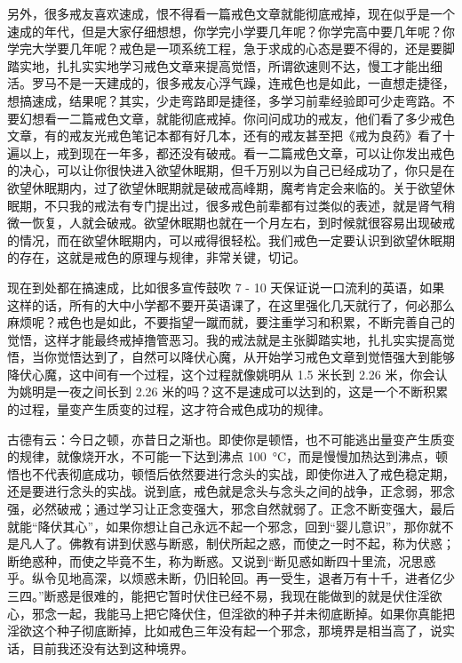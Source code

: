 另外，很多戒友喜欢速成，恨不得看一篇戒色文章就能彻底戒掉，现在似乎是一个速成的年代，但是大家仔细想想，你学完小学要几年呢？你学完高中要几年呢？你学完大学要几年呢？戒色是一项系统工程，急于求成的心态是要不得的，还是要脚踏实地，扎扎实实地学习戒色文章来提高觉悟，所谓欲速则不达，慢工才能出细活。罗马不是一天建成的，很多戒友心浮气躁，连戒色也是如此，一直想走捷径，想搞速成，结果呢？其实，少走弯路即是捷径，多学习前辈经验即可少走弯路。不要幻想看一二篇戒色文章，就能彻底戒掉。你问问成功的戒友，他们看了多少戒色文章，有的戒友光戒色笔记本都有好几本，还有的戒友甚至把《戒为良药》看了十遍以上，戒到现在一年多，都还没有破戒。看一二篇戒色文章，可以让你发出戒色的决心，可以让你很快进入欲望休眠期，但千万别以为自己已经成功了，你只是在欲望休眠期内，过了欲望休眠期就是破戒高峰期，魔考肯定会来临的。关于欲望休眠期，不只我的戒法有专门提出过，很多戒色前辈都有过类似的表述，就是肾气稍微一恢复，人就会破戒。欲望休眠期也就在一个月左右，到时候就很容易出现破戒的情况，而在欲望休眠期内，可以戒得很轻松。我们戒色一定要认识到欲望休眠期的存在，这就是戒色的原理与规律，非常关键，切记。

现在到处都在搞速成，比如很多宣传鼓吹 7 - 10 天保证说一口流利的英语，如果这样的话，所有的大中小学都不要开英语课了，在这里强化几天就行了，何必那么麻烦呢？戒色也是如此，不要指望一蹴而就，要注重学习和积累，不断完善自己的觉悟，这样才能最终戒掉撸管恶习。我的戒法就是主张脚踏实地，扎扎实实提高觉悟，当你觉悟达到了，自然可以降伏心魔，从开始学习戒色文章到觉悟强大到能够降伏心魔，这中间有一个过程，这个过程就像姚明从 1.5 米长到 2.26 米，你会认为姚明是一夜之间长到 2.26 米的吗？这不是速成可以达到的，这是一个不断积累的过程，量变产生质变的过程，这才符合戒色成功的规律。

古德有云：今日之顿，亦昔日之渐也。即使你是顿悟，也不可能逃出量变产生质变的规律，就像烧开水，不可能一下达到沸点 \SI{100}{\degreeCelsius}，而是慢慢加热达到沸点，顿悟也不代表彻底成功，顿悟后依然要进行念头的实战，即使你进入了戒色稳定期，还是要进行念头的实战。说到底，戒色就是念头与念头之间的战争，正念弱，邪念强，必然破戒；通过学习让正念变强大，邪念自然就弱了。正念不断变强大，最后就能“降伏其心”，如果你想让自己永远不起一个邪念，回到“婴儿意识”，那你就不是凡人了。佛教有讲到伏惑与断惑，制伏所起之惑，而使之一时不起，称为伏惑；断绝惑种，而使之毕竟不生，称为断惑。又说到“断见惑如断四十里流，况思惑乎。纵令见地高深，以烦惑未断，仍旧轮回。再一受生，退者万有十千，进者亿少三四。”断惑是很难的，能把它暂时伏住已经不易，我现在能做到的就是伏住淫欲心，邪念一起，我能马上把它降伏住，但淫欲的种子并未彻底断掉。如果你真能把淫欲这个种子彻底断掉，比如戒色三年没有起一个邪念，那境界是相当高了，说实话，目前我还没有达到这种境界。

